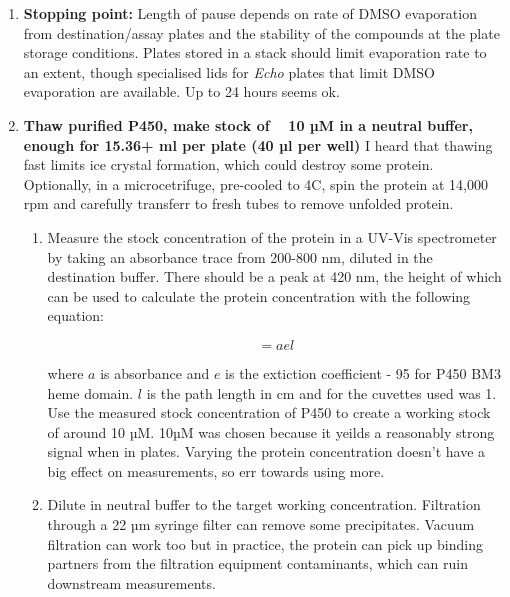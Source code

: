 \documentclass{article}
\begin{document}
\begin{enumerate}
	\item \textbf{Stopping point:} Length of pause depends on rate of DMSO evaporation from destination/assay plates and the stability of the compounds at the plate storage conditions. 
		Plates stored in a stack should limit evaporation rate to an extent, though specialised lids for \textit{Echo} plates that limit DMSO evaporation are available.
Up to 24 hours seems ok.

\item \textbf{Thaw purified P450, make stock of ~ 10 µM in a neutral buffer, enough for 15.36+ ml per plate (40 µl per well)}
I heard that thawing fast limits ice crystal formation, which could destroy some protein.
Optionally, in a microcetrifuge, pre-cooled to 4C, spin the protein at 14,000 rpm and carefully transferr to fresh tubes to remove unfolded protein.
	\begin{enumerate}

	\item Measure the stock concentration of the protein in a UV-Vis spectrometer by taking an absorbance trace from 200-800 nm, diluted in the destination buffer.
	There should be a peak at 420 nm, the height of which can be used to calculate the protein concentration with the following equation:

			\begin{equation}
				[P450]  = a e l  
			\end{equation}

       where $a$ is absorbance and $e$ is the extiction coefficient - 95 for P450 BM3 heme domain.
       $l$ is the path length in cm and for the cuvettes used was 1.
       Use the measured stock concentration of P450 to create a working stock of around 10 µM.
       10µM was chosen because it yeilds a reasonably strong signal when in plates.
       Varying the protein concentration doesn't have a big effect on measurements, so err towards using more.


	\item Dilute in neutral buffer to the target working concentration.
	Filtration through a 22 µm syringe filter can remove some precipitates.
	Vacuum filtration can work too but in practice, the protein can pick up binding partners from the filtration equipment contaminants, which can ruin downstream measurements.
	\end{enumerate}


\end{enumerate}
\end{document}
